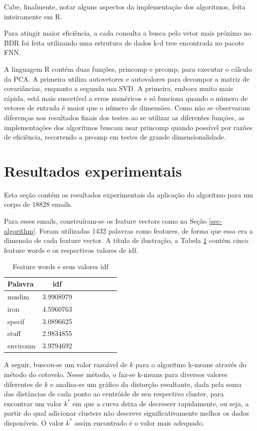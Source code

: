 \documentclass[10pt,twocolumn,letterpaper]{article}
\begin{document}
Cabe, finalmente, notar alguns aspectos da implementação dos algoritmos, feita inteiramente em R.

Para atingir maior eficiência, a cada consulta a busca pelo vetor mais próximo no BDR foi feita utilizando uma estrutura de dados k-d tree encontrada no pacote FNN.

A linguagem R contém duas funções, princomp e prcomp, para executar o cálculo da PCA. A primeira utiliza autovetores e autovalores para decompor a matriz de covariâncias, enquanto a segunda usa SVD. A primeira, embora muito mais rápida, está mais suscetível a erros numéricos e só funciona quando o número de vetores de entrada é maior que o número de dimensões. Como não se observaram diferenças nos resultados finais dos testes ao se utilizar as diferentes funções, as implementações dos algoritmos buscam usar princomp quando possível por razões de eficiência, recorrendo a prcomp em testes de grande dimensionalidade.


\section{Resultados experimentais}
\label{sec-experiments}

Esta seção contém os resultados experimentais da aplicação do algoritmo para um corpo de 18828 emails.

Para esses emails, construíram-se os feature vectors como na Seção \ref{sec-algorithm}. Foram utilizadas 1432 palavras como features, de forma que essa era a dimensão de cada feature vector. A título de ilustração, a Tabela \ref{tbl-feature-words} contém cinco feature words e os respectivos valores de idf.

\begin{table}
\begin{center}
\begin{tabular}{l*{6}{c}r}
Palavra & idf  \\
\hline
muslim & 3.9908979 \\
iron & 4.5960763 \\
specif & 3.0896625 \\
stuff & 2.9834855 \\
environm & 3.9794692 \\
\end{tabular}
\end{center}
\caption{Feature words e seus valores idf}
\label{tbl-feature-words}
\end{table}

A seguir, buscou-se um valor razoável de $k$ para o algoritmo k-means através do método do cotovelo. Nesse método, o faz-se k-means para diversos valores diferentes de $k$ e analisa-se um gráfico da distorção resultante, dada pela soma das distâncias de cada ponto ao centróide de seu respectivo cluster, para encontrar um valor $k^{*}$ em que a curva deixa de decrescer rapidamente, ou seja, a partir do qual adicionar clusters não descreve significativamente melhor os dados disponíveis. O valor $k^{*}$ assim encontrado é o valor mais adequado.
\end{document}
